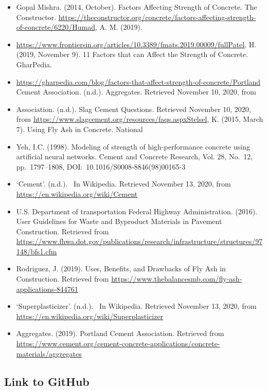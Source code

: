 \documentclass[letterpaper,9pt,twocolumn,twoside,]{pinp}
\providecommand{\tightlist}{%
  \setlength{\itemsep}{0pt}\setlength{\parskip}{0pt}}
\begin{document}
\begin{itemize}
\tightlist
\item
  Gopal Mishra. (2014, October). Factors Affecting Strength of Concrete.
  The Constructor.
  \url{https://theconstructor.org/concrete/factors-affecting-strength-of-concrete/6220/Humad},
  A. M. (2019).
\item
  \url{https://www.frontiersin.org/articles/10.3389/fmats.2019.00009/fullPatel},
  H. (2019, November 9). 11 Factors that can Affect the Strength of
  Concrete. GharPedia.
\item
  \url{https://gharpedia.com/blog/factors-that-affect-strength-of-concrete/Portland}
  Cement Association. (n.d.). Aggregates. Retrieved November 10, 2020,
  from
\item
  Association. (n.d.). Slag Cement Questions. Retrieved November 10,
  2020, from
  \url{https://www.slagcement.org/resources/faqs.aspxStelsel}, K. (2015,
  March 7). Using Fly Ash in Concrete. National
\item
  Yeh, I.C. (1998). Modeling of strength of high-performance concrete
  using artificial neural networks. Cement and Concrete Research, Vol.
  28, No.~12, pp.~1797--1808, DOI:~10.1016/S0008-8846(98)00165-3
\item
  `Cement'. (n.d.). ~In Wikipedia. Retrieved November 13, 2020, from
  \url{https://en.wikipedia.org/wiki/Cement}
\item
  U.S. Department of transportation Federal Highway Administration.
  (2016). User Guidelines for Waste and Byproduct Materials in Pavement
  Construction. Retrieved from
  \url{https://www.fhwa.dot.gov/publications/research/infrastructure/structures/97148/bfs1.cfm}
\item
  Rodriguez, J. (2019). Uses, Benefits, and Drawbacks of Fly Ash in
  Construction. Retrieved from
  \url{https://www.thebalancesmb.com/fly-ash-applications-844761}
\item
  `Superplasticizer'. (n.d.). ~In Wikipedia. Retrieved November 13,
  2020, from \url{https://en.wikipedia.org/wiki/Superplasticizer}
\item
  Aggregates. (2019). Portland Cement Association. Retrieved from
  \url{https://www.cement.org/cement-concrete-applications/concrete-materials/aggregates}
\end{itemize}

\hypertarget{link-to-github}{%
\subsection{Link to GitHub}\label{link-to-github}}
\end{document}

